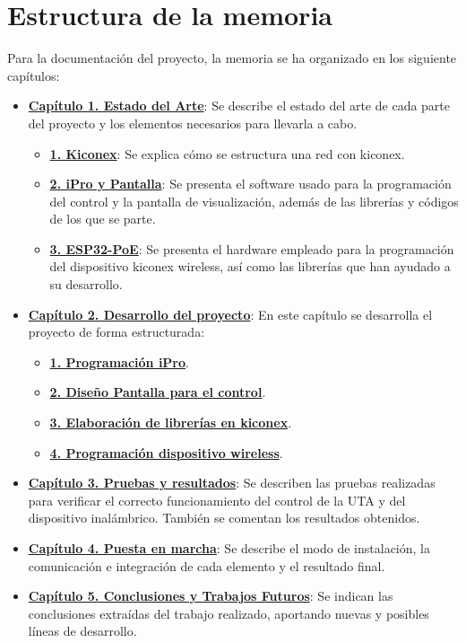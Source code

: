 \section{Estructura de la memoria}
\label{sec:estructura}

Para la documentación del proyecto, la memoria se ha organizado en los siguiente capítulos:

\begin{itemize}
	\item \textbf{\hyperref[chap:estadoArte]{Capítulo 1. Estado del Arte}}: Se describe el estado del arte de cada parte del proyecto y los elementos necesarios para llevarla a cabo.
  \begin{itemize}
    \item \textbf{\hyperref[sec:kiconex]{1. Kiconex}}: Se explica cómo se estructura una red con kiconex.
    \item \textbf{\hyperref[sec:ipro]{2. iPro y Pantalla}}: Se presenta el software usado para la programación del control y la pantalla de visualización, además de las librerías y códigos de los que se parte.
    \item \textbf{\hyperref[sec:esp32poe]{3. ESP32-PoE}}: Se presenta el hardware empleado para la programación del dispositivo kiconex wireless, así como las librerías que han ayudado a su desarrollo.
  \end{itemize}
	\item \textbf{\hyperref[chap:desarrollo]{Capítulo 2. Desarrollo del proyecto}}: En este capítulo se desarrolla el proyecto de forma estructurada:
  \begin{itemize}
    \item \textbf{\hyperref[sec:programacionipro]{1. Programación iPro}}.
    \item \textbf{\hyperref[sec:programacionpantalla]{2. Diseño Pantalla para el control}}.
    \item \textbf{\hyperref[sec:librerias]{3. Elaboración de librerías en kiconex}}.
    \item \textbf{\hyperref[sec:programacionesp32]{4. Programación dispositivo wireless}}.
  \end{itemize}

	\item \textbf{\hyperref[chap:resultados]{Capítulo 3. Pruebas y resultados}}: Se describen las pruebas realizadas para verificar el correcto funcionamiento del control de la UTA y del dispositivo inalámbrico. También se comentan los resultados obtenidos.
	\item \textbf{\hyperref[chap:puestaEnMarcha]{Capítulo 4. Puesta en marcha}}: Se describe el modo de instalación, la comunicación e integración de cada elemento y el resultado final.
	\item \textbf{\hyperref[chap:conclusiones]{Capítulo 5. Conclusiones y Trabajos Futuros}}: Se indican las conclusiones extraídas del trabajo realizado, aportando nuevas y posibles líneas de desarrollo.
\end{itemize}


